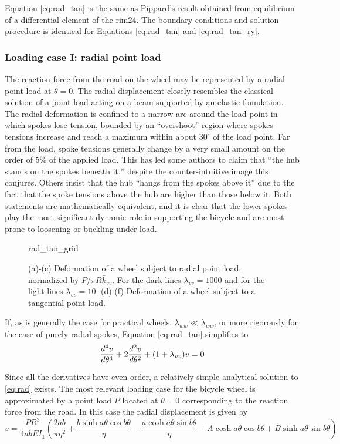 \documentclass[\rootdir/thesis.tex]{subfiles}
\begin{document}
Equation \eqref{eq:rad_tan} is the same as Pippard’s result obtained from equilibrium of a differential element of the rim24. The boundary conditions and solution procedure is identical for Equations \eqref{eq:rad_tan} and \eqref{eq:rad_tan_ry}.

\subsubsection{Loading case I: radial point load}

The reaction force from the road on the wheel may be represented by a radial point load at $\theta=0$. The radial displacement closely resembles the classical solution of a point load acting on a beam supported by an elastic foundation\cite{Hetenyi}. The radial deformation is confined to a narrow arc around the load point in which spokes lose tension, bounded by an ``overshoot'' region where spokes tensions increase and reach a maximum within about 30$^{\circ}$ of the load point. Far from the load, spoke tensions generally change by a very small amount on the order of 5\% of the applied load. This has led some authors to claim that ``the hub stands on the spokes beneath it,'' despite the counter-intuitive image this conjures\cite{Brandt}. Others insist that the hub ``hangs from the spokes above it'' due to the fact that the spoke tensions above the hub are higher than those below it.  Both statements are mathematically equivalent, and it is clear that the lower spokes play the most significant dynamic role in supporting the bicycle and are most prone to loosening or buckling under load.

\begin{figure}
\centering
{rad_tan_grid}
\caption{(a)-(c) Deformation of a wheel subject to radial point load, normalized by $P/\pi R\bar{k}_{vv}$. For the dark lines $\lambda_{vv}=1000$ and for the light lines $\lambda_{vv}=10$. (d)-(f) Deformation of a wheel subject to a tangential point load.}
\label{fig:rad_tan_grid}
\end{figure}

If, as is generally the case for practical wheels, $\lambda_{ww} \ll \lambda_{ww}$, or more rigorously for the case of purely radial spokes, Equation \eqref{eq:rad_tan} simplifies to
\begin{equation}
\label{eq:rad}
\frac{d^4v}{d\theta^4} + 2\frac{d^2v}{d\theta^2} + (1+\lambda_{vv})v=0
\end{equation}

Since all the derivatives have even order, a relatively simple analytical solution to \eqref{eq:rad} exists. The most relevant loading case for the bicycle wheel is approximated by a point load $P$ located at $\theta=0$ corresponding to the reaction force from the road. In this case the radial displacement is given by
\begin{equation}
\label{eq:rad_soln}
v = \frac{PR^3}{4abEI_1} \left( \frac{2ab}{\pi\eta^2} + \frac{b\sinh{a\theta}\cos{b\theta}}{\eta} 
                               -\frac{a\cosh{a\theta}\sin{b\theta}}{\eta}
                               +A\cosh{a\theta}\cos{b\theta} + B\sinh{a\theta}\sin{b\theta}\right)
\end{equation}
\end{document}
